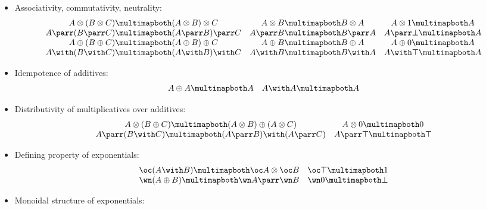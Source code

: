 \begin{itemize}
\tightlist
\item
  Associativity, commutativity, neutrality:
  \begin{equation*}
    \begin{array}{ccc}
    A \tens (B \tens C) \linequiv (A \tens B) \tens C & A \tens B \linequiv B \tens A & A \tens \one \linequiv A \\
    A \parr (B \parr C) \linequiv (A \parr B) \parr C & A \parr B \linequiv B \parr A & A \parr \bot \linequiv A \\
    A \plus (B \plus C) \linequiv (A \plus B) \plus C & A \plus B \linequiv B \plus A & A \plus \zero \linequiv A \\
A \with (B \with C) \linequiv (A \with B) \with C & A \with B \linequiv B \with A & A \with \top \linequiv A
    \end{array}
  \end{equation*}
\item
  Idempotence of additives:
  \begin{equation*}
    \begin{array}{cc}
      A \plus A \linequiv A & A \with A \linequiv A
    \end{array}
  \end{equation*}
\item
  Distributivity of multiplicatives over additives:
  \begin{equation*}
    \begin{array}{cc}
       A \tens (B \plus C) \linequiv (A \tens B) \plus (A \tens C) & A \tens \zero \linequiv \zero \\
       A \parr (B \with C) \linequiv (A \parr B) \with (A \parr C) & A \parr \top \linequiv \top
    \end{array}
  \end{equation*}
\item
  Defining property of exponentials:
  \begin{equation*}
    \begin{array}{cc}
       \oc(A \with B) \linequiv \oc A \tens \oc B & \oc\top \linequiv \one \\
       \wn(A \plus B) \linequiv \wn A \parr \wn B & \wn\zero \linequiv \bot
    \end{array}
  \end{equation*}
\item
  Monoidal structure of exponentials:
  \begin{equation*}
    \begin{array}{cc}

\end{array}
\end{equation*}
\end{itemize}
